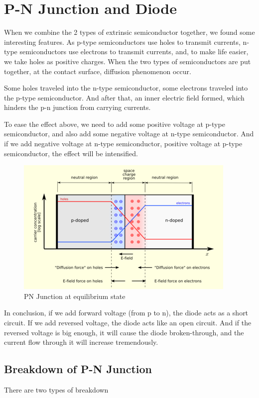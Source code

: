\section{P-N Junction and Diode}

When we combine the 2 types of extrinsic semiconductor together, we found some interesting features. As p-type semiconductors use holes to transmit currents, n-type semiconductors use electrons to transmit currents, and, to make life easier, we take holes as positive charges. When the two types of semiconductors are put together, at the contact surface, diffusion phenomenon occur.

Some holes traveled into the n-type semiconductor, some electrons traveled into the p-type semiconductor. And after that, an inner electric field formed, which hinders the p-n junction from carrying currents.

To ease the effect above, we need to add some positive voltage at p-type semiconductor, and also add some negative voltage at n-type semiconductor. And if we add negative voltage at n-type semiconductor, positive voltage at p-type semiconductor, the effect will be intensified.

\begin{figure}[H]
  \centering
  \includegraphics[width=0.5\linewidth]{figures/Pn-junction-equilibrium.png}
  \caption{PN Junction at equilibrium state}
  \label{fig:}
\end{figure}

In conclusion, if we add forward voltage (from p to n), the diode acts as a short circuit. If we add reversed voltage, the diode acts like an open circuit. And if the reversed voltage is big enough, it will cause the diode broken-through, and the current flow through it will increase tremendously.

\subsection{Breakdown of P-N Junction}

There are two types of breakdown


